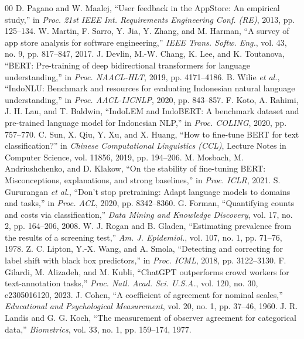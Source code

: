 \documentclass[conference]{IEEEtran}
\begin{document}
\begin{thebibliography}{00}
 D. Pagano and W. Maalej, ``User feedback in the AppStore: An empirical study,'' in \textit{Proc. 21st IEEE Int. Requirements Engineering Conf. (RE)}, 2013, pp. 125--134.
 W. Martin, F. Sarro, Y. Jia, Y. Zhang, and M. Harman, ``A survey of app store analysis for software engineering,'' \textit{IEEE Trans. Softw. Eng.}, vol. 43, no. 9, pp. 817--847, 2017.
 J. Devlin, M.-W. Chang, K. Lee, and K. Toutanova, ``BERT: Pre-training of deep bidirectional transformers for language understanding,'' in \textit{Proc. NAACL-HLT}, 2019, pp. 4171--4186.
 B. Wilie \textit{et al.}, ``IndoNLU: Benchmark and resources for evaluating Indonesian natural language understanding,'' in \textit{Proc. AACL-IJCNLP}, 2020, pp. 843--857.
 F. Koto, A. Rahimi, J. H. Lau, and T. Baldwin, ``IndoLEM and IndoBERT: A benchmark dataset and pre-trained language model for Indonesian NLP,'' in \textit{Proc. COLING}, 2020, pp. 757--770.
 C. Sun, X. Qiu, Y. Xu, and X. Huang, ``How to fine-tune BERT for text classification?'' in \textit{Chinese Computational Linguistics (CCL)}, Lecture Notes in Computer Science, vol. 11856, 2019, pp. 194--206.
 M. Mosbach, M. Andriushchenko, and D. Klakow, ``On the stability of fine-tuning BERT: Misconceptions, explanations, and strong baselines,'' in \textit{Proc. ICLR}, 2021.
 S. Gururangan \textit{et al.}, ``Don't stop pretraining: Adapt language models to domains and tasks,'' in \textit{Proc. ACL}, 2020, pp. 8342--8360.
 G. Forman, ``Quantifying counts and costs via classification,'' \textit{Data Mining and Knowledge Discovery}, vol. 17, no. 2, pp. 164--206, 2008.
 W. J. Rogan and B. Gladen, ``Estimating prevalence from the results of a screening test,'' \textit{Am. J. Epidemiol.}, vol. 107, no. 1, pp. 71--76, 1978.
 Z. C. Lipton, Y.-X. Wang, and A. Smola, ``Detecting and correcting for label shift with black box predictors,'' in \textit{Proc. ICML}, 2018, pp. 3122--3130.
 F. Gilardi, M. Alizadeh, and M. Kubli, ``ChatGPT outperforms crowd workers for text-annotation tasks,'' \textit{Proc. Natl. Acad. Sci. U.S.A.}, vol. 120, no. 30, e2305016120, 2023.
 J. Cohen, ``A coefficient of agreement for nominal scales,'' \textit{Educational and Psychological Measurement}, vol. 20, no. 1, pp. 37--46, 1960.
 J. R. Landis and G. G. Koch, ``The measurement of observer agreement for categorical data,'' \textit{Biometrics}, vol. 33, no. 1, pp. 159--174, 1977.

\end{thebibliography}
\end{document}
